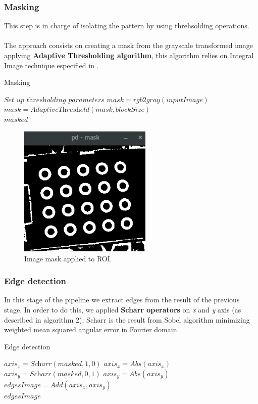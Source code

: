 \documentclass[journal]{IEEEtran}
\begin{document}
\subsubsection{ Masking }
This step is in charge of isolating the pattern by using threhsolding operations.
\\
\\
The approach consists on creating a mask from the grayscale transformed image applying \textbf{Adaptive Thresholding algorithm}, this algorithm relies on Integral Image technique especified in \cite{IntegralImageThresholding}.
\begin{algorithm}
\caption{Masking}
\label{alg:mask2}
\begin{algorithmic}[1]
\State $\textit{Set up thresholding parameters}$
\State $mask   = \textit{rgb2gray}( inputImage )$
\State $mask   = \textit{AdaptiveThreshold}(mask, blockSize)$\\
\Return $masked$
\end{algorithmic}
\end{algorithm}
\begin{figure}[H]
\centering
\includegraphics[width=2.5in]{_img/img_report2_mask.png}
\caption{Image mask applied to ROI.}
\end{figure}

\subsubsection{Edge detection}
In this stage of the pipeline we extract edges from the result of the previous stage. In order to do this, we applied \textbf{Scharr operators} on \textit{x} and \textit{y} axis (as described in algorithm 2); Scharr is the result from Sobel algorithm minimizing weighted mean squared angular error in Fourier domain.
\begin{algorithm}
\caption{Edge detection}
\begin{algorithmic}[1]
\State $axis_x   = \textit{Scharr}(masked, 1, 0)$
\State $axis_x   = \textit{Abs}(axis_x)$
\State $axis_y   = \textit{Scharr}(masked, 0, 1)$
\State $axis_y   = \textit{Abs}(axis_y)$
\State $edgesImage   = \textit{Add}(axis_x, axis_y)$ \\
\Return $edgesImage$
\end{algorithmic}
\end{algorithm}
\end{document}
